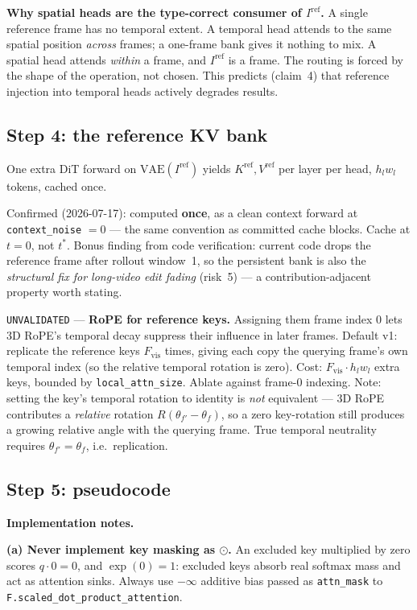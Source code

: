 \documentclass{article}
\begin{document}
\textbf{Why spatial heads are the type-correct consumer of $I^{\mathrm{ref}}$.}
A single reference frame has no temporal extent. A temporal head attends to the
same spatial position \emph{across} frames; a one-frame bank gives it nothing to
mix. A spatial head attends \emph{within} a frame, and $I^{\mathrm{ref}}$ is a
frame. The routing is forced by the shape of the operation, not chosen. This
predicts (claim~4) that reference injection into temporal heads actively
degrades results.

\subsection{Step 4: the reference KV bank}

One extra DiT forward on $\mathrm{VAE}(I^{\mathrm{ref}})$ yields
$K^{\mathrm{ref}}, V^{\mathrm{ref}}$ per layer per head, $h_l w_l$ tokens,
cached once.

Confirmed (2026-07-17): computed \textbf{once}, as a clean context forward at
\texttt{context\_noise} $= 0$ --- the same convention as committed cache
blocks. Cache at $t = 0$, not $t^{*}$. Bonus finding from code verification:
current code drops the reference frame after rollout window~1, so the
persistent bank is also the \emph{structural fix for long-video edit fading}
(risk~5) --- a contribution-adjacent property worth stating.

\texttt{UNVALIDATED} --- \textbf{RoPE for reference keys.} Assigning them frame
index $0$ lets 3D RoPE's temporal decay suppress their influence in later frames.
Default v1: replicate the reference keys $F_{\mathrm{vis}}$ times, giving each
copy the querying frame's own temporal index (so the relative temporal rotation
is zero). Cost: $F_{\mathrm{vis}} \cdot h_l w_l$ extra keys, bounded by
\texttt{local\_attn\_size}. Ablate against frame-$0$ indexing.
Note: setting the key's temporal rotation to identity is \emph{not} equivalent
--- 3D RoPE contributes a \emph{relative} rotation $R(\theta_{f'} - \theta_f)$,
so a zero key-rotation still produces a growing relative angle with the querying
frame. True temporal neutrality requires $\theta_{f'} = \theta_f$, i.e.\
replication.

\subsection{Step 5: pseudocode}

\textbf{Implementation notes.}

\textbf{(a) Never implement key masking as $\odot$.} An excluded key multiplied
by zero scores $q\cdot 0 = 0$, and $\exp(0)=1$: excluded keys absorb real
softmax mass and act as attention sinks. Always use $-\infty$ additive bias
passed as \texttt{attn\_mask} to \texttt{F.scaled\_dot\_product\_attention}.
\end{document}
